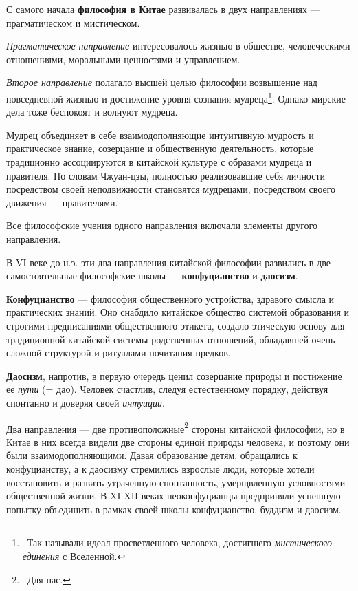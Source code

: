 \documentclass[twoside,a4paper]{article}
\begin{document}
{
С самого начала \textbf{философия в Китае} развивалась в двух направлениях — прагматическом и мистическом. }

{
\textit{Прагматическое} \textit{направление} интересовалось жизнью в обществе, человеческими отношениями, моральными
ценностями и управлением. }

{
\textit{Второе направление} полагало высшей целью философии возвышение над повседневной жизнью и достижение уровня
сознания мудреца\footnote{\foreignlanguage{russian}{\ Так называли идеал просветленного человека, достигшего
}\foreignlanguage{russian}{\textit{мистического единения}}\foreignlanguage{russian}{ с Вселенной.}}. Однако мирские
дела тоже беспокоят и волнуют мудреца. }

{
Мудрец объединяет в себе взаимодополняющие интуитивную мудрость и практическое знание, созерцание и общественную
деятельность, которые традиционно ассоциируются в китайской культуре с образами мудреца и правителя. По словам
Чжуан-цзы, полностью реализовавшие себя личности {\textquotedbl}посредством своей неподвижности становятся мудрецами,
посредством своего движения — правителями{\textquotedbl}.}

{
Все философские учения одного направления включали элементы другого направления.}

{
В \foreignlanguage{english}{VI} веке до н.э. эти два направления китайской философии развились в две самостоятельные
философские школы — \textbf{конфуцианство} и \textbf{даосизм}. }

{
\textbf{Конфуцианство} — философия общественного устройства, здравого смысла и практических знаний. Оно снабдило
китайское общество системой образования и строгими предписаниями общественного этикета, создало этическую основу для
традиционной китайской системы родственных отношений, обладавшей очень сложной структурой и ритуалами почитания
предков. }

{
\textbf{Даосизм}, напротив, в первую очередь ценил созерцание природы и постижение ее \textit{пути} (= дао). Человек
счастлив, следуя естественному порядку, действуя спонтанно и доверяя своей \textit{интуиции}.}

{
Два направления — две противоположные\footnote{\foreignlanguage{russian}{\ Для нас.}} стороны китайской философии, но в
Китае в них всегда видели две стороны единой природы человека, и поэтому они были взаимодополняющими. Давая образование
детям, обращались к конфуцианству, а к даосизму стремились взрослые люди, которые хотели восстановить и развить
утраченную спонтанность, умерщвленную условностями общественной жизни. В
\foreignlanguage{english}{XI}{}-\foreignlanguage{english}{XII} веках неоконфуцианцы предприняли успешную попытку
объединить в рамках своей школы конфуцианство, буддизм и даосизм. }
\end{document}
